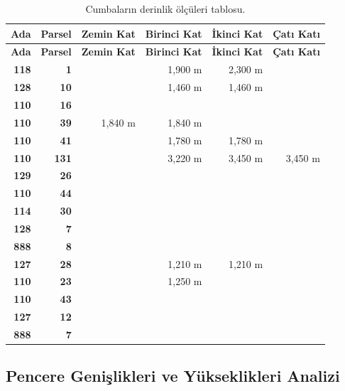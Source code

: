 \documentclass[12pt,turkish,a4paperpaper,]{report}
\begin{document}
\begin{longtable}[]{@{}rrrrrr@{}}
\caption{Cumbaların derinlik ölçüleri tablosu.}\tabularnewline
\toprule
\textbf{Ada} & \textbf{Parsel} & \textbf{Zemin Kat} & \textbf{Birinci
Kat} & \textbf{İkinci Kat} & \textbf{Çatı Katı}\tabularnewline
\midrule
\endfirsthead
\toprule
\textbf{Ada} & \textbf{Parsel} & \textbf{Zemin Kat} & \textbf{Birinci
Kat} & \textbf{İkinci Kat} & \textbf{Çatı Katı}\tabularnewline
\midrule
\endhead
\textbf{118} & \textbf{1} & & 1,900 m & 2,300 m &\tabularnewline
\textbf{128} & \textbf{10} & & 1,460 m & 1,460 m &\tabularnewline
\textbf{110} & \textbf{16} & & & &\tabularnewline
\textbf{110} & \textbf{39} & 1,840 m & 1,840 m & &\tabularnewline
\textbf{110} & \textbf{41} & & 1,780 m & 1,780 m &\tabularnewline
\textbf{110} & \textbf{131} & & 3,220 m & 3,450 m & 3,450
m\tabularnewline
\textbf{129} & \textbf{26} & & & &\tabularnewline
\textbf{110} & \textbf{44} & & & &\tabularnewline
\textbf{114} & \textbf{30} & & & &\tabularnewline
\textbf{128} & \textbf{7} & & & &\tabularnewline
\textbf{888} & \textbf{8} & & & &\tabularnewline
\textbf{127} & \textbf{28} & & 1,210 m & 1,210 m &\tabularnewline
\textbf{110} & \textbf{23} & & 1,250 m & &\tabularnewline
\textbf{110} & \textbf{43} & & & &\tabularnewline
\textbf{127} & \textbf{12} & & & &\tabularnewline
\textbf{888} & \textbf{7} & & & &\tabularnewline
\bottomrule
\end{longtable}

\newpage

\hypertarget{pencere-geniux15flikleri-ve-yuxfckseklikleri-analizi}{%
\subsection{Pencere Genişlikleri ve Yükseklikleri
Analizi}\label{pencere-geniux15flikleri-ve-yuxfckseklikleri-analizi}}
\end{document}
